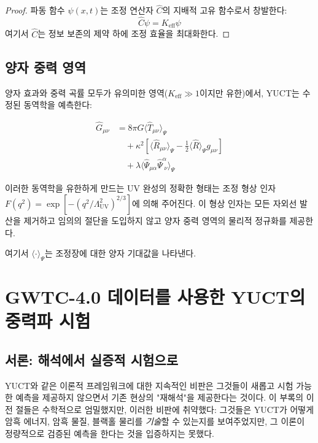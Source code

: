 \documentclass[11pt,a4paper]{article}
\theoremstyle{remark}
\newcommand{\Keff}{K_{\mathrm{eff}}}
\begin{document}
	\begin{proof}
		파동 함수 $\psi(x,t)$는 조정 연산자 $\hat{C}$의 지배적 고유 함수로서 창발한다:
		\[
		\hat{C} \psi = \Keff \psi
		\]
		여기서 $\hat{C}$는 정보 보존의 제약 하에 조정 효율을 최대화한다.
	\end{proof}
	
	\subsection{양자 중력 영역}
	
	양자 효과와 중력 곡률 모두가 유의미한 영역($\Keff \gg 1$이지만 유한)에서, YUCT는 수정된 동역학을 예측한다:
	
	\begin{equation}
		\begin{aligned}
			\hat{G}_{\mu\nu} &= 8\pi G \langle \hat{T}_{\mu\nu} \rangle_{\Psi} \\
			&\quad + \kappa^2 \left[ \langle \hat{R}_{\mu\nu} \rangle_{\Psi} - \frac{1}{2} \langle \hat{R} \rangle_{\Psi} g_{\mu\nu} \right] \\
			&\quad + \lambda \langle \hat{\Psi}_{\mu\alpha} \hat{\Psi}^{\alpha}_{\;\nu} \rangle_{\Psi}
		\end{aligned}
	\end{equation}
	
	이러한 동역학을 유한하게 만드는 UV 완성의 정확한 형태는 조정 형상 인자 $F(q^2)=\exp[-(q^2/\Lambda_{\mathrm{UV}}^2)^{2/3}]$에 의해 주어진다. 이 형상 인자는 모든 자외선 발산을 제거하고 임의의 절단을 도입하지 않고 양자 중력 영역의 물리적 정규화를 제공한다.
	
	여기서 $\langle \cdot \rangle_{\Psi}$는 조정장에 대한 양자 기대값을 나타낸다.
	
	\section{GWTC-4.0 데이터를 사용한 YUCT의 중력파 시험}
	\label{sec:gw-tests}
	
	\subsection{서론: 해석에서 실증적 시험으로}
	
	YUCT와 같은 이론적 프레임워크에 대한 지속적인 비판은 그것들이 새롭고 시험 가능한 예측을 제공하지 않으면서 기존 현상의 "재해석"을 제공한다는 것이다. 이 부록의 이전 절들은 수학적으로 엄밀했지만, 이러한 비판에 취약했다: 그것들은 YUCT가 어떻게 암흑 에너지, 암흑 물질, 블랙홀 물리를 \textit{기술}할 수 있는지를 보여주었지만, 그 이론이 정량적으로 검증된 예측을 한다는 것을 입증하지는 못했다.
	
\end{document}
